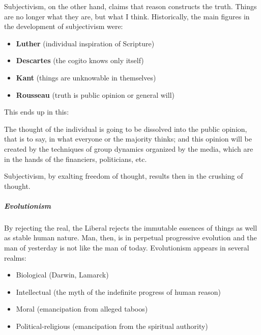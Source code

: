 Subjectivism, on the other hand, claims that reason constructs the truth. Things are no longer what they are, but what I think. Historically, the main figures in the development of subjectivism were:

\begin{itemize}


\item \textbf{Luther} (individual inspiration of Scripture)


\item \textbf{Descartes} (the cogito knows only itself)


\item \textbf{Kant} (things are unknowable in themselves)


\item \textbf{Rousseau} (truth is public opinion or general will)

\end{itemize}


This ends up in this:

\begin{quotex}
The thought of the individual is going to be dissolved into the public opinion, that is to say, in what everyone or the majority thinks; and this opinion will be created by the techniques of group dynamics organized by the media, which are in the hands of the financiers, politicians, etc.
\end{quotex}


Subjectivism, by exalting freedom of thought, results then in the crushing of thought.

\subparagraph{Evolutionism}


By rejecting the real, the Liberal rejects the immutable essences of things as well as stable human nature. Man, then, is in perpetual progressive evolution and the man of yesterday is not like the man of today. Evolutionism appears in several realms:

\begin{itemize}


\item Biological (Darwin, Lamarck)

\item Intellectual (the myth of the indefinite progress of human reason)

\item Moral (emancipation from alleged taboos)

\item Political-religious (emancipation from the spiritual authority)
\end{itemize}



